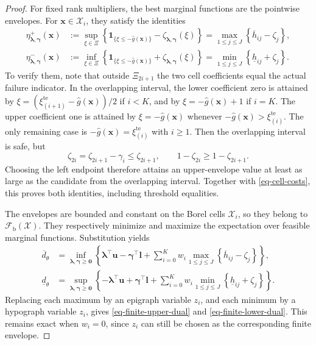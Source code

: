 \begin{proof}
  For fixed rank multipliers, the best marginal functions are the pointwise envelopes. For $\bm x\in\mathcal X_i$, they satisfy the identities
  \begin{equation}
    \begin{aligned}
      \eta^+_{\bm\lambda,\bm\gamma}(\bm x)
        &:=\sup_{\xi\in\Xi}\left\{\mathbf1_{\{\xi\le-\hat g(\bm x)\}}
          -\zeta_{\bm\lambda,\bm\gamma}(\xi)\right\}
          =\max_{1\le j\le J}\left\{\overline h_{ij}-\zeta_j\right\},\\
      \eta^-_{\bm\lambda,\bm\gamma}(\bm x)
        &:=\inf_{\xi\in\Xi}\left\{\mathbf1_{\{\xi\le-\hat g(\bm x)\}}
          +\zeta_{\bm\lambda,\bm\gamma}(\xi)\right\}
          =\min_{1\le j\le J}\left\{\underline h_{ij}+\zeta_j\right\}.
    \end{aligned}
    \label{eq-dual-envelope-identities}
  \end{equation}
  To verify them, note that outside $\Xi_{2i+1}$ the two cell coefficients equal the actual failure indicator. In the overlapping interval, the lower coefficient zero is attained by $\xi=\left(\xi_{(i+1)}^{\mathrm{te}}-\hat g(\bm x)\right)/2$ if $i<K$, and by $\xi=-\hat g(\bm x)+1$ if $i=K$. The upper coefficient one is attained by $\xi=-\hat g(\bm x)$ whenever $-\hat g(\bm x)>\xi_{(i)}^{\mathrm{te}}$. The only remaining case is $-\hat g(\bm x)=\xi_{(i)}^{\mathrm{te}}$ with $i\ge1$. Then the overlapping interval is safe, but
  \[
    \zeta_{2i}=\zeta_{2i+1}-\gamma_i\le\zeta_{2i+1},
    \qquad
    1-\zeta_{2i}\ge1-\zeta_{2i+1}.
  \]
  Choosing the left endpoint therefore attains an upper-envelope value at least as large as the candidate from the overlapping interval. Together with \eqref{eq-cell-costs}, this proves both identities, including threshold equalities.

  The envelopes are bounded and constant on the Borel cells $\mathcal X_i$, so they belong to $\mathcal F_{\mathrm b}(\mathcal X)$. They respectively minimize and maximize the expectation over feasible marginal functions. Substitution yields
  \begin{align}
    \overline d_\theta
      &=\inf_{\bm\lambda,\bm\gamma\ge\bm0}\left\{
        \bm\lambda^\top\bm u-\bm\gamma^\top\bm l
        +\sum_{i=0}^{K}w_i\max_{1\le j\le J}
          \left\{\overline h_{ij}-\zeta_j\right\}\right\},
      \label{eq-upper-measure-dual}\\
    \underline d_\theta
      &=\sup_{\bm\lambda,\bm\gamma\ge\bm0}\left\{
        -\bm\lambda^\top\bm u+\bm\gamma^\top\bm l
        +\sum_{i=0}^{K}w_i\min_{1\le j\le J}
          \left\{\underline h_{ij}+\zeta_j\right\}\right\}.
      \label{eq-lower-measure-dual}
  \end{align}
  Replacing each maximum by an epigraph variable $z_i$, and each minimum by a hypograph variable $z_i$, gives \eqref{eq-finite-upper-dual} and \eqref{eq-finite-lower-dual}. This remains exact when $w_i=0$, since $z_i$ can still be chosen as the corresponding finite envelope.


\end{proof}
